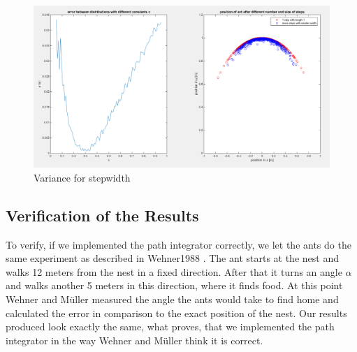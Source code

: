 \documentclass[11pt]{article}
\begin{document}
\begin{figure}[H]
\centering
\includegraphics[scale=0.32]{./Pics/VarianceForStepWidth_plot.png} 
\caption{Variance for stepwidth \label{fig:Variance} }
\end{figure} 


\subsection{Verification of the Results}


To verify, if we implemented the path integrator correctly, we let the ants do the same experiment as described in Wehner1988 \cite{Wehner1988}.
The ant starts at the nest and walks 12 meters from the nest in a fixed direction. After that it turns an angle $\alpha$ and walks another 5 meters in this direction, where it finds food. At this point Wehner and Müller measured the angle the ants would take to find home and calculated the error in comparison to the exact position of the nest.
Our results produced look exactly the same, what proves, that we implemented the path integrator in the way Wehner and Müller think it is correct.\\
\end{document}
